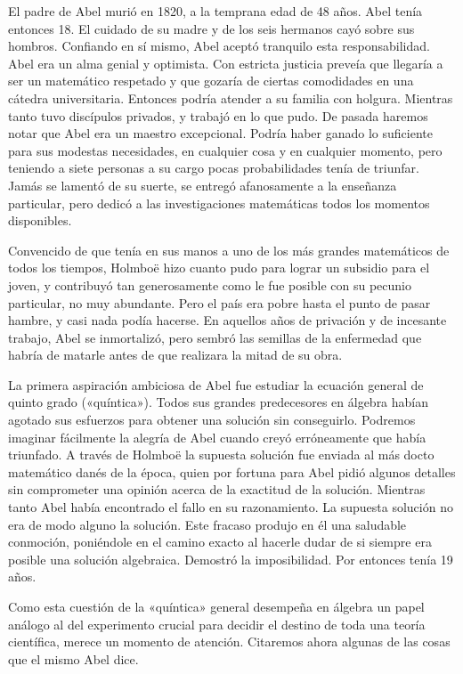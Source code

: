 \documentclass[a4paper, 12pt, draft]{article}
\begin{document}
El padre de Abel murió en 1820, a la temprana edad de 48 años. Abel tenía entonces 18. El cuidado de su madre y de los seis hermanos cayó sobre sus hombros. Confiando en sí mismo, Abel aceptó tranquilo esta responsabilidad. Abel era un alma genial y optimista. Con estricta justicia preveía que llegaría a ser un matemático respetado y que gozaría de ciertas comodidades en una cátedra universitaria. Entonces podría atender a su familia con holgura. Mientras tanto tuvo discípulos privados, y trabajó en lo que pudo. De pasada haremos notar que Abel era un maestro excepcional. Podría haber ganado lo suficiente para sus modestas necesidades, en cualquier cosa y en cualquier momento, pero teniendo a siete personas a su cargo pocas probabilidades tenía de triunfar. Jamás se lamentó de su suerte, se entregó afanosamente a la enseñanza particular, pero dedicó a las investigaciones matemáticas todos los momentos disponibles.

Convencido de que tenía en sus manos a uno de los más grandes matemáticos de todos los tiempos, Holmboë hizo cuanto pudo para lograr un subsidio para el joven, y contribuyó tan generosamente como le fue posible con su pecunio particular, no muy abundante. Pero el país era pobre hasta el punto de pasar hambre, y casi nada podía hacerse. En aquellos años de privación y de incesante trabajo, Abel se inmortalizó, pero sembró las semillas de la enfermedad que habría de matarle antes de que realizara la mitad de su obra.

La primera aspiración ambiciosa de Abel fue estudiar la ecuación general de quinto grado («quíntica»). Todos sus grandes predecesores en álgebra habían agotado sus esfuerzos para obtener una solución sin conseguirlo. Podremos imaginar fácilmente la alegría de Abel cuando creyó erróneamente que había triunfado. A través de Holmboë la supuesta solución fue enviada al más docto matemático danés de la época, quien por fortuna para Abel pidió algunos detalles sin comprometer una opinión acerca de la exactitud de la solución. Mientras tanto Abel había encontrado el fallo en su razonamiento. La supuesta solución no era de modo alguno la solución. Este fracaso produjo en él una saludable conmoción, poniéndole en el camino exacto al hacerle dudar de si siempre era posible una solución algebraica. Demostró la imposibilidad. Por entonces tenía 19 años.

Como esta cuestión de la «quíntica» general desempeña en álgebra un papel análogo al del experimento crucial para decidir el destino de toda una teoría científica, merece un momento de atención. Citaremos ahora algunas de las cosas que el mismo Abel dice.
\end{document}
